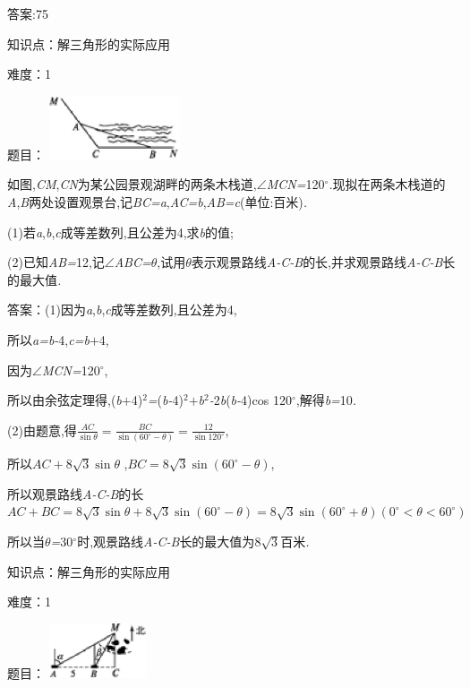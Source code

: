 \documentclass{article} %
\begin{document}
 答案:75

知识点：解三角形的实际应用

难度：1

题目：
\includegraphics*[width=1.52in, height=0.74in, keepaspectratio=false]{image1124}

 如图,\textit{CM},\textit{CN}为某公园景观湖畔的两条木栈道,$\mathrm{\angle}$\textit{MCN=}120$\mathrm{{}^\circ}$\textit{.}现拟在两条木栈道的\textit{A},\textit{B}两处设置观景台,记\textit{BC=a},\textit{AC=b},\textit{AB=c}(单位:百米)\textit{.}

 (1)若\textit{a},\textit{b},\textit{c}成等差数列,且公差为4,求\textit{b}的值;

 (2)已知\textit{AB=}12,记$\mathrm{\angle}$\textit{ABC=$\theta$},试用\textit{$\theta$}表示观景路线\textit{A-C-B}的长,并求观景路线\textit{A-C-B}长的最大值\textit{.}

 答案：(1)因为\textit{a},\textit{b},\textit{c}成等差数列,且公差为4,

所以\textit{a=b-}4,\textit{c=b$+$}4,

因为$\mathrm{\angle}$\textit{MCN=}120$\mathrm{{}^\circ}$,

所以由余弦定理得,(\textit{b$+$}4)${}^{2}$\textit{=}(\textit{b-}4)${}^{2}$\textit{$+$b}${}^{2}$\textit{-}2\textit{b}(\textit{b-}4)cos 120$\mathrm{{}^\circ}$,解得\textit{b=}10\textit{.}

(2)由题意,得$\frac{AC}{\sin\theta}=\frac{BC}{\sin(60^{\circ}-\theta)}=\frac{12}{\sin120^{\circ}}$,

所以$AC+8\sqrt{3}\sin\theta$ ,$BC=8\sqrt{3}\sin(60^{\circ}-\theta)$,

所以观景路线\textit{A-C-B}的长
$AC+BC=8\sqrt{3}\sin\theta+8\sqrt{3}\sin(60^{\circ}-\theta)=8\sqrt{3}\sin(60^{\circ}+\theta)(0^{\circ}<\theta<60^{\circ})$

所以当\textit{$\theta$=}30$\mathrm{{}^\circ}$时,观景路线\textit{A-C-B}长的最大值为$8\sqrt{3}$百米\textit{.}

知识点：解三角形的实际应用

难度：1

题目：
\includegraphics*[width=1.14in, height=0.64in, keepaspectratio=false]{image1133}
\end{document}
